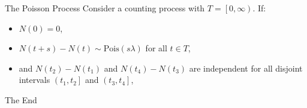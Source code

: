 \documentclass[10pt]{beamer}
\begin{document}
\begin{frame}[fragile]{The Poisson Process}
Consider a counting process with \(T = \left[0, \infty\right)\). If:
\begin{itemize}[<+->]
    \item \(N\left(0\right) = 0\),
    \item \(N\left(t + s\right) - N\left(t\right) \sim \textrm{Pois}\left(s\lambda\right)\) for all \(t \in T\),
    \item and \(N\left(t_2\right) - N\left(t_1\right)\) and \(N\left(t_4\right) - N\left(t_3\right)\) are independent for all disjoint intervals \(\left(t_1, t_2\right]\) and \(\left(t_3, t_4\right]\),
\end{itemize}
\end{frame}

\begin{frame}[standout]
The End
\end{frame}
\end{document}
